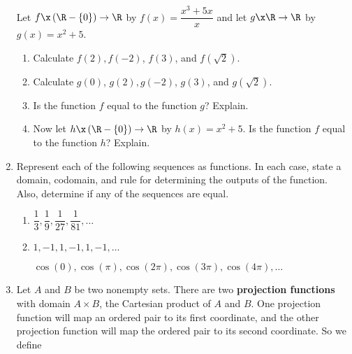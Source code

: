 \begin{enumerate}
\xitem Let $f\x \left(\R - \{0 \} \right) \to \R$ by $f(x) = \dfrac{x^3 + 5x}{x}$ and let 
$g\x \R \to \R$ by \linebreak $g(x) = x^2 + 5$. \label{exer62:realfunction}

\begin{enumerate}
  \item Calculate  $f( 2 ), f( -2 )$, 
$f( 3 )$, and $f( \sqrt{2} )$.


  \item Calculate  $g( 0 )$, $g( 2 ), g( -2 )$, 
$g( 3 )$, and $g( \sqrt{2} )$.

  \item Is the function  $f$  equal to the function $g$?  Explain.

  \item Now let $h\x \left(\R - \{0 \} \right) \to \R$ by $h(x) = x^2 + 5$.  Is the function  
$f$  equal to the function $h$?  Explain.
\end{enumerate}

\item Represent each of the following sequences as functions.  In each case, state a domain, codomain, and rule for determining the outputs of the function.  Also, determine if any of the sequences are equal. \label{exer:sec62-3}

\begin{enumerate}
  \yitem $1, \dfrac{1}{4}, \dfrac{1}{9}, \dfrac{1}{{16}},  \ldots $

  \item $\dfrac{1}{3}, \dfrac{1}{9}, \dfrac{1}{{27}}, \dfrac{1}{{81}},  \ldots $

  \item $1,  - 1, 1,  - 1, 1,  - 1,  \ldots $

  \yitem $\cos( 0 ), \cos( \pi  ), \cos( {2\pi } ), \cos( {3\pi } ), \cos( {4\pi } ),  \ldots $
\end{enumerate}

\item Let  $A$  and  $B$  be two nonempty sets.  There are two \textbf{projection functions}
%
%
 with domain  $A \times B$, the Cartesian product of  $A$  and  $B$.  One projection function will map an ordered pair to its first coordinate, and the other projection function will map the ordered pair to its second coordinate.   So we define  \label{sym:projfunc}
\end{enumerate}
